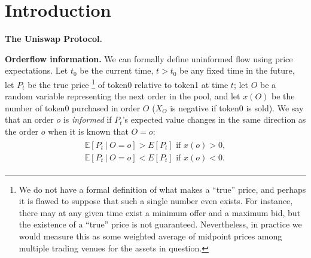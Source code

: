 \section{Introduction} \label{section:intro}

    \textbf{The Uniswap Protocol.}

    \textbf{Orderflow information.}
        We can formally define uninformed flow using price expectations. Let $t_0$ be the current time, $t>t_0$ be any fixed time in the future, let $P_t$ be the true price \footnote{We do not have a formal definition of what makes a ``true'' price, and perhaps it is flawed to suppose that such a single number even exists. For instance, there may at any given time exist a minimum offer and a maximum bid, but the existence of a ``true'' price is not guaranteed. Nevertheless, in practice we would measure this as some weighted average of midpoint prices among multiple trading venues for the assets in question.} of token0 relative to token1 at time $t$; 
        let $O$ be a random variable representing the next order in the pool, %
        and let $x(O)$ be the number of token0 purchased in order $O$ ($X_O$ is negative if token0 is sold). We say that an order $o$ is \textit{informed} if $P_t$'s expected value changes in the same direction as the order $o$ when it is known that $O=o$:
        \begin{align}
            \begin{split}
                \mathbb E [P_t \ | \ O=o] > E[P_t] \text{ if } x(o) > 0, \\
                \mathbb E [P_t \ | \ O=o] < E[P_t] \text{ if } x(o) < 0.    
            \end{split}
        \end{align}

